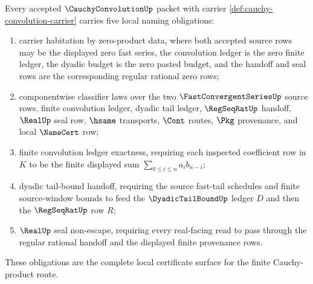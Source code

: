 \begin{theorem}
\label{thm:cauchy-convolution-namecert-obligations}
Every accepted $\CauchyConvolutionUp$ packet with carrier \autoref{def:cauchy-convolution-carrier} carries five local naming obligations:
\begin{enumerate}
\item carrier habitation by zero-product data, where both accepted source rows may be the displayed zero fast series, the convolution ledger is the zero finite ledger, the dyadic budget is the zero pasted budget, and the handoff and seal rows are the corresponding regular rational zero rows;
\item componentwise classifier laws over the two $\FastConvergentSeriesUp$ source rows, finite convolution ledger, dyadic tail ledger, $\RegSeqRatUp$ handoff, $\RealUp$ seal row, $\hsame$ transports, $\Cont$ routes, $\Pkg$ provenance, and local $\NameCert$ row;
\item finite convolution ledger exactness, requiring each inspected coefficient row in $K$ to be the finite displayed sum $\sum_{0 \leq i \leq n} a_i b_{n-i}$;
\item dyadic tail-bound handoff, requiring the source fast-tail schedules and finite source-window bounds to feed the $\DyadicTailBoundUp$ ledger $D$ and then the $\RegSeqRatUp$ row $R$;
\item $\RealUp$ seal non-escape, requiring every real-facing read to pass through the regular rational handoff and the displayed finite provenance rows.
\end{enumerate}
These obligations are the complete local certificate surface for the finite Cauchy-product route.
\end{theorem}
